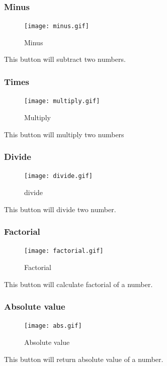 \documentclass[11pt, a4paper]{article}
\begin{document}
    \subsubsection{Minus}
    \label{subsubsec:minus}
        \begin{figure}[h]
            \caption{Minus}
            \texttt{[image: minus.gif]}
            \centering
            \label{fig:minus}
        \end{figure}
        This button will subtract two numbers.
\newpage
    \subsubsection{Times}
    \label{subsubsec:times}
        \begin{figure}[h]
            \caption{Multiply}
            \texttt{[image: multiply.gif]}
            \centering
            \label{fig:mul}
        \end{figure}
        This button will multiply two numbers
    \subsubsection{Divide}
    \label{subsubsec:division}
        \begin{figure}[h]
            \caption{divide}
            \texttt{[image: divide.gif]}
            \centering
            \label{fig:div}
        \end{figure}
        This button will divide two number.
    \subsubsection{Factorial}
    \label{subsubsec:factorial}
        \begin{figure}[h]
            \caption{Factorial}
            \texttt{[image: factorial.gif]}
            \centering
            \label{fig:fact}
        \end{figure}
        This button will calculate factorial of a number.
    \subsubsection{Absolute value}
    \label{subsubsec:absolute value}
        \begin{figure}[h]
            \caption{Absolute value}
            \texttt{[image: abs.gif]}
            \centering
            \label{fig:abs_v}
        \end{figure}
        This button will return absolute value of a number.
\end{document}
